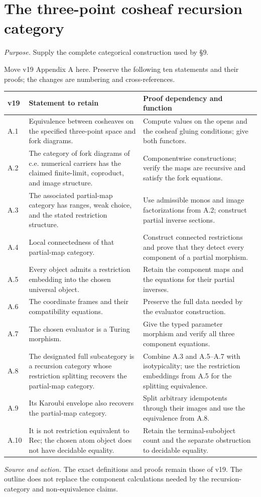 \documentclass[11pt]{article}
\theoremstyle{definition}\newtheorem{definition}[theorem]{Definition}
\newcommand{\source}[1]{\par\smallskip\noindent\textit{Source and action.} #1\par\smallskip}
\newcommand{\purpose}[1]{\noindent\textit{Purpose.} #1\par\medskip}
\begin{document}
\section{The three-point cosheaf recursion category}
\purpose{Supply the complete categorical construction used by \S9.}
Move v19 Appendix A here. Preserve the following ten statements
and their proofs; the changes are numbering and cross-references.
\begin{longtable}{@{}p{}p{}p{}@{}}
\toprule
v19 & Statement to retain & Proof dependency and function\\\midrule\endhead
A.1 & Equivalence between cosheaves on the specified three-point space and fork diagrams. & Compute values on the opens and the cosheaf gluing conditions; give both functors.\\
A.2 & The category of fork diagrams of c.e. numerical carriers has the claimed finite-limit, coproduct, and image structure. & Componentwise constructions; verify the maps are recursive and satisfy the fork equations.\\
A.3 & The associated partial-map category has ranges, weak choice, and the stated restriction structure. & Use admissible monos and image factorizations from A.2; construct partial inverse sections.\\
A.4 & Local connectedness of that partial-map category. & Construct connected restrictions and prove that they detect every component of a partial morphism.\\
A.5 & Every object admits a restriction embedding into the chosen universal object. & Retain the component maps and the equations for their partial inverses.\\
A.6 & The coordinate frames and their compatibility equations. & Preserve the full data needed by the evaluator construction.\\
A.7 & The chosen evaluator is a Turing morphism. & Give the typed parameter morphism and verify all three component equations.\\
A.8 & The designated full subcategory is a recursion category whose restriction splitting recovers the partial-map category. & Combine A.3 and A.5--A.7 with isotypicality; use the restriction embeddings from A.5 for the splitting equivalence.\\
A.9 & Its Karoubi envelope also recovers the partial-map category. & Split arbitrary idempotents through their images and use the equivalence from A.8.\\
A.10 & It is not restriction equivalent to $\mathrm{Rec}$; the chosen atom object does not have decidable equality. & Retain the terminal-subobject count and the separate obstruction to decidable equality.\\
\bottomrule
\end{longtable}
\source{The exact definitions and proofs remain those of v19. The outline does not replace the component calculations needed by the recursion-category and non-equivalence claims.}
\end{document}
